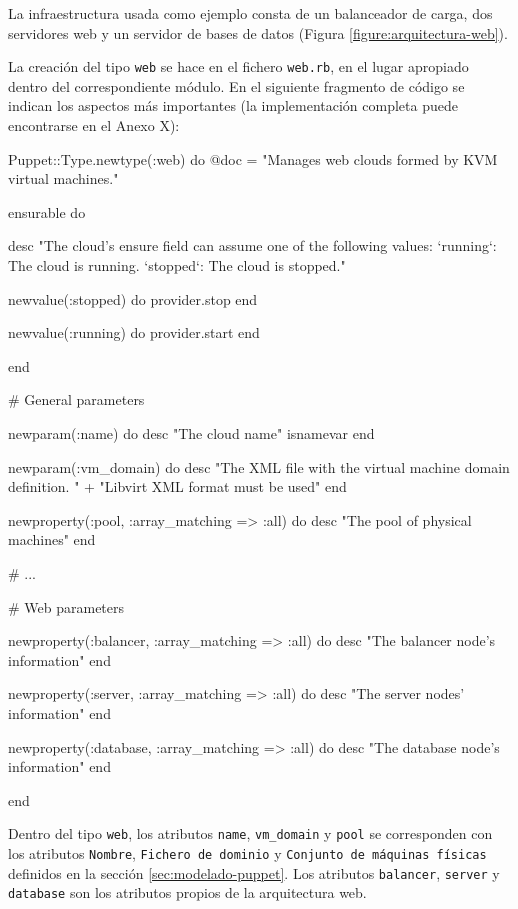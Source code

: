 La infraestructura usada como ejemplo consta de un balanceador de carga, dos servidores web y un servidor de bases de datos (Figura \ref{figure:arquitectura-web}).


\pagebreak

La creación del tipo \texttt{web} se hace en el fichero \texttt{web.rb}, en el lugar apropiado dentro del correspondiente módulo. En el siguiente fragmento de código se indican los aspectos más importantes (la implementación completa puede encontrarse en el Anexo X):

\begin{rubycode}
Puppet::Type.newtype(:web) do
   @doc = "Manages web clouds formed by KVM virtual machines."
   
   
   ensurable do

      desc "The cloud's ensure field can assume one of the following values:
   `running`: The cloud is running.
   `stopped`: The cloud is stopped.\n"
   
      newvalue(:stopped) do
         provider.stop
      end

      newvalue(:running) do
         provider.start
      end

   end


   # General parameters
   
   newparam(:name) do
      desc "The cloud name"
      isnamevar
   end
   
   newparam(:vm_domain) do
      desc "The XML file with the virtual machine domain definition. " +
           "Libvirt XML format must be used"
   end
   
   newproperty(:pool, :array_matching => :all) do
      desc "The pool of physical machines"
   end

   # ...


   # Web parameters
   
   newproperty(:balancer, :array_matching => :all) do
      desc "The balancer node's information"
   end
   
   newproperty(:server, :array_matching => :all) do
      desc "The server nodes' information"
   end
   
   newproperty(:database, :array_matching => :all) do
      desc "The database node's information"
   end

end

\end{rubycode}

Dentro del tipo \texttt{web}, los atributos \texttt{name}, \texttt{vm\_domain} y \texttt{pool} se corresponden con los atributos \texttt{Nombre}, \texttt{Fichero de dominio} y \texttt{Conjunto de máquinas físicas} definidos en la sección \ref{sec:modelado-puppet}. Los atributos \texttt{balancer}, \texttt{server} y \texttt{database} son los atributos propios de la arquitectura web.

